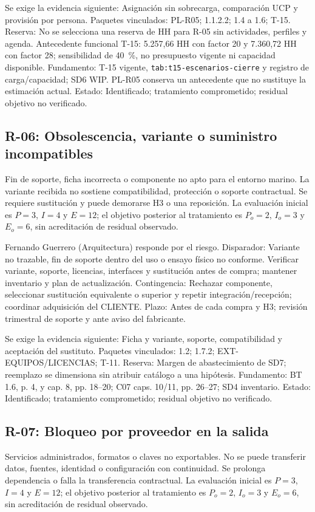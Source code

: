 Se exige la evidencia siguiente: Asignación sin sobrecarga, comparación UCP y provisión por persona. Paquetes vinculados: PL-R05; 1.1.2.2; 1.4 a 1.6; T-15. Reserva: No se selecciona una reserva de HH para R-05 sin actividades, perfiles y agenda. Antecedente funcional T-15: 5.257,66 HH con factor 20 y 7.360,72 HH con factor 28; sensibilidad de 40 \,\%, no presupuesto vigente ni capacidad disponible. Fundamento: T-15 vigente, \texttt{tab:t15-escenarios-cierre} y registro de carga/capacidad; SD6 WIP. PL-R05 conserva un antecedente que no sustituye la estimación actual. Estado: Identificado; tratamiento comprometido; residual objetivo no verificado.

\subsection{R-06: Obsolescencia, variante o suministro incompatibles}
Fin de soporte, ficha incorrecta o componente no apto para el entorno marino. La variante recibida no sostiene compatibilidad, protección o soporte contractual. Se requiere sustitución y puede demorarse H3 o una reposición. La evaluación inicial es $P=3$, $I=4$ y $E=12$; el objetivo posterior al tratamiento es $P_o=2$, $I_o=3$ y $E_o=6$, sin acreditación de residual observado.

Fernando Guerrero (Arquitectura) responde por el riesgo. Disparador: Variante no trazable, fin de soporte dentro del uso o ensayo físico no conforme. Verificar variante, soporte, licencias, interfaces y sustitución antes de compra; mantener inventario y plan de actualización. Contingencia: Rechazar componente, seleccionar sustitución equivalente o superior y repetir integración/recepción; coordinar adquisición del CLIENTE. Plazo: Antes de cada compra y H3; revisión trimestral de soporte y ante aviso del fabricante.

Se exige la evidencia siguiente: Ficha y variante, soporte, compatibilidad y aceptación del sustituto. Paquetes vinculados: 1.2; 1.7.2; EXT-EQUIPOS/LICENCIAS; T-11. Reserva: Margen de abastecimiento de SD7; reemplazo se dimensiona sin atribuir catálogo a una hipótesis. Fundamento: BT 1.6, p. 4, y cap. 8, pp. 18–20; C07 caps. 10/11, pp. 26–27; SD4 inventario. Estado: Identificado; tratamiento comprometido; residual objetivo no verificado. \parencites[numeral 1.6, p.~4; cap.~8, pp.~18--20]{sd8-bt}[caps.~10/11, pp.~26--27]{sd8-c07}

\subsection{R-07: Bloqueo por proveedor en la salida}
Servicios administrados, formatos o claves no exportables. No se puede transferir datos, fuentes, identidad o configuración con continuidad. Se prolonga dependencia o falla la transferencia contractual. La evaluación inicial es $P=3$, $I=4$ y $E=12$; el objetivo posterior al tratamiento es $P_o=2$, $I_o=3$ y $E_o=6$, sin acreditación de residual observado.

